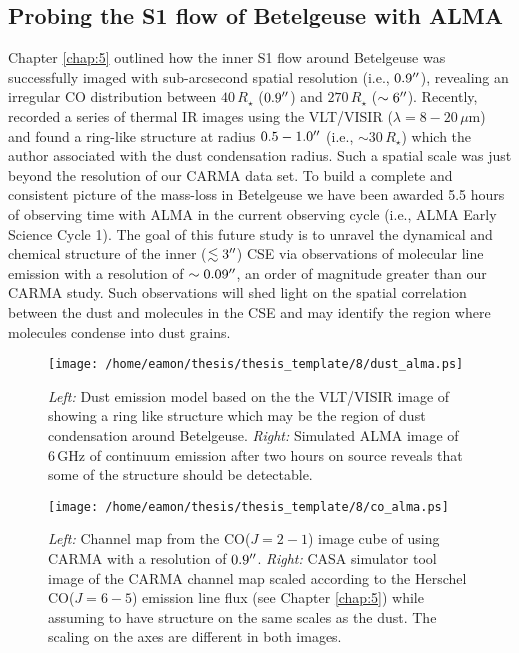 \subsection{Probing the S1 flow of Betelgeuse with ALMA}\label{sec:8.2.1}
Chapter \ref{chap:5} outlined how the inner S1 flow around Betelgeuse was successfully imaged with sub-arcsecond spatial resolution (i.e., $0.9^{\prime\prime}$), revealing an irregular CO distribution between $40\,R_{\star}$ ($0.9^{\prime\prime}$) and $270\,R_{\star}$ ($\sim 6^{\prime\prime}$). Recently, \cite{kervella_2011} recorded a series of thermal IR images using the VLT/VISIR ($\lambda = 8-20\,\mu$m) and found a ring-like structure at radius $0.5-1.0^{\prime\prime}$ (i.e., $\sim 30\,R_{\star}$) which the author associated with the dust condensation radius. Such a spatial scale was just beyond the resolution of our CARMA data set. To build a complete and consistent picture of the mass-loss in Betelgeuse we have been awarded 5.5 hours of observing time with ALMA in the current observing cycle (i.e., ALMA Early Science Cycle 1). The goal of this future study is to unravel the dynamical and chemical structure of the inner ($\lesssim 3^{\prime\prime}$) CSE via observations of molecular line emission with a resolution of $\sim 0.09^{\prime\prime}$, an order of magnitude greater than our CARMA study. Such observations will shed light on the spatial correlation between the dust and molecules in the CSE and may identify the region where molecules condense into dust grains.

\begin{figure}[!ht]
\centering 
        \texttt{[image: /home/eamon/thesis/thesis\_template/8/dust\_alma.ps]}
\caption[Simulating ALMA dust observations.]{\textit{Left:} Dust emission model based on the the VLT/VISIR image of \cite{kervella_2011} showing a ring like structure which may be the region of dust condensation around Betelgeuse. \textit{Right:} Simulated ALMA image of 6\,GHz of continuum emission after two hours on source reveals that some of the structure should be detectable. }
\label{fig:8.1}
\end{figure}

\begin{figure}[!ht]
\centering 
        \texttt{[image: /home/eamon/thesis/thesis\_template/8/co\_alma.ps]}
\caption[Simulating ALMA CO(J=6-5) observations.]{\textit{Left:} Channel map from the CO($J=2-1$) image cube of \cite{ogorman_2012} using CARMA with a resolution of $0.9^{\prime\prime}$. \textit{Right:} CASA simulator tool image of the CARMA channel map scaled according to the Herschel CO($J=6-5$) emission line flux (see Chapter \ref{chap:5}) while assuming to have structure on the same scales as the dust. The scaling on the axes are different in both images.} 
\label{fig:8.2}
\end{figure}

